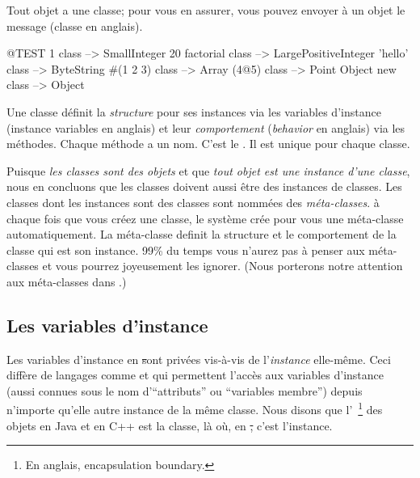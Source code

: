 \documentclass[a4paper,10pt,twoside]{book}
\begin{document}
Tout objet a une classe; pour vous en assurer, vous pouvez envoyer à un objet le message  (classe en anglais).

\begin{code}{@TEST}
1 class                 --> SmallInteger 
20 factorial class --> LargePositiveInteger
'hello' class          --> ByteString
#(1 2 3) class       --> Array
(4@5) class         --> Point
Object new class --> Object
\end{code}

Une classe définit la \emph{structure} pour ses instances via les variables d'instance (instance variables en anglais)
et leur \emph{comportement} (\emph{behavior} en anglais) via les méthodes.
Chaque méthode a un nom. C'est le . Il est unique pour chaque classe.

Puisque \emph{les classes sont des objets} et que \emph{tout objet est une instance d'une classe}, nous en concluons que les classes doivent aussi être des instances de classes.
Les classes dont les instances sont des classes sont nommées des \emph{méta-classes}.
à chaque fois que vous créez une classe, le système crée pour vous une méta-classe
automatiquement.
La méta-classe definit la structure et le comportement de la classe qui est son instance.
99\% du temps vous n'aurez pas à penser aux méta-classes et vous pourrez joyeusement les ignorer.
(Nous porterons notre attention aux méta-classes dans .)

\subsection{Les variables d'instance}

Les variables d'instance en \st sont privées vis-à-vis de l'\emph{instance} elle-même.
Ceci diffère de langages comme  et  qui permettent l'accès aux variables d'instance (aussi connues sous le nom d'``attributs'' ou ``variables membre'') depuis n'importe qu'elle autre instance de la même classe.
Nous disons que l'~\footnote{En anglais, encapsulation boundary.} des objets en Java et en C++ est la classe, là où, en \st, c'est l'instance.
\end{document}

